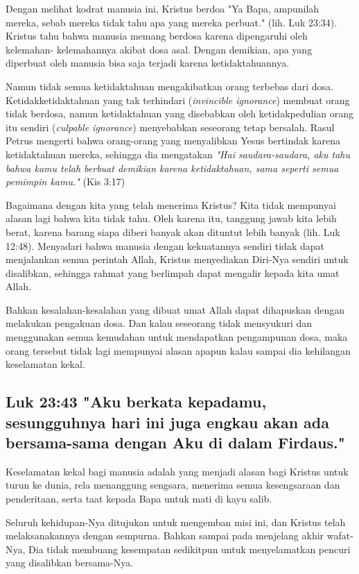 Dengan melihat kodrat manusia ini, Kristus berdoa "Ya Bapa, ampunilah mereka,
sebab mereka tidak tahu apa yang mereka perbuat." (lih. Luk 23:34). Kristus
tahu bahwa manusia memang berdosa karena dipengaruhi oleh kelemahan-
kelemahannya akibat dosa asal. Dengan demikian, apa yang diperbuat oleh manusia
bisa saja terjadi karena ketidaktahuannya. 

Namun tidak semua ketidaktahuan
mengakibatkan orang terbebas dari dosa. Ketidakketidaktahuan yang tak
terhindari (\textit{invincible ignorance}) membuat orang tidak berdosa, namun
ketidaktahuan yang disebabkan oleh ketidakpedulian orang itu sendiri (\textit{culpable
ignorance}) menyebabkan seseorang tetap bersalah. Rasul Petrus mengerti bahwa
orang-orang yang menyalibkan Yesus bertindak karena ketidaktahuan mereka,
sehingga dia mengatakan \textit{"Hai saudara-saudara, aku tahu bahwa kamu telah berbuat
demikian karena ketidaktahuan, sama seperti semua pemimpin kamu."} (Kis 3:17)

Bagaimana dengan kita yang telah menerima Kristus? Kita tidak mempunyai alasan
lagi bahwa kita tidak tahu. Oleh karena itu, tanggung jawab kita lebih berat,
karena barang siapa diberi banyak akan dituntut lebih banyak (lih. Luk 12:48).
Menyadari bahwa manusia dengan kekuatannya sendiri tidak dapat menjalankan
semua perintah Allah, Kristus menyediakan Diri-Nya sendiri untuk disalibkan,
sehingga rahmat yang berlimpah dapat mengalir kepada kita umat Allah. 

Bahkan
kesalahan-kesalahan yang dibuat umat Allah dapat dihapuskan dengan melakukan
pengakuan dosa. Dan kalau seseorang tidak mensyukuri dan menggunakan semua
kemudahan untuk mendapatkan pengampunan dosa, maka orang tersebut tidak lagi
mempunyai alasan apapun kalau sampai dia kehilangan keselamatan kekal.

\subsection{Luk 23:43 "Aku berkata kepadamu, sesungguhnya hari ini juga engkau
akan ada bersama-sama dengan Aku di dalam Firdaus."}

Keselamatan kekal bagi manusia adalah yang menjadi alasan bagi Kristus untuk
turun ke dunia, rela menanggung sengsara, menerima semua kesengsaraan dan
penderitaan, serta taat kepada Bapa untuk mati di kayu salib. 

Seluruh
kehidupan-Nya ditujukan untuk mengemban misi ini, dan Kristus telah
melaksanakannya dengan sempurna. Bahkan sampai pada menjelang akhir wafat-Nya,
Dia tidak membuang kesempatan sedikitpun untuk menyelamatkan pencuri yang
disalibkan bersama-Nya.

